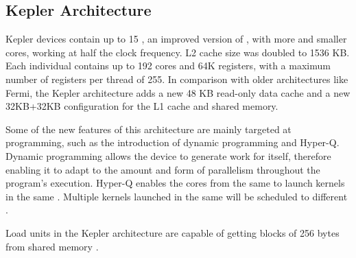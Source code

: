 \documentclass[../thesis]{subfiles}
\begin{document}
	\subsection{\nvidia Kepler Architecture}
	\label{subsec:cuda:arch:kepler}
	
	Kepler devices contain up to 15 \smx, an improved version of \sm, with more and smaller cores, working at half the clock frequency. L2 cache size was doubled to 1536 KB. Each individual \smx contains up to 192 cores and 64K registers, with a maximum number of registers per thread of 255. In comparison with older architectures like Fermi, the Kepler architecture adds a new 48 KB read-only data cache and a new 32KB+32KB configuration for the L1 cache and shared memory.

	Some of the new features of this architecture are mainly targeted at programming, such as the introduction of dynamic programming and Hyper-Q. Dynamic programming allows the device to generate work for itself, therefore enabling it to adapt to the amount and form of parallelism throughout the program's execution. Hyper-Q enables the cores from the same \cpu to launch kernels in the same \gpu. Multiple kernels launched in the same \gpu will be scheduled to different \smx.

	Load units in the Kepler architecture are capable of getting blocks of 256 bytes from shared memory \cite{NVIDIA:KEPLER}.
\end{document}
